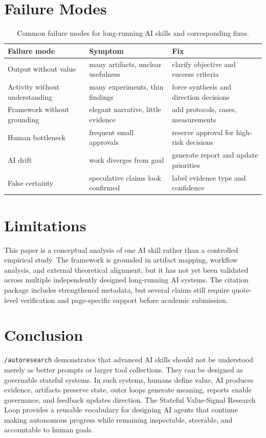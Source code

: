 \documentclass[11pt]{article}
\begin{document}
\section{Failure Modes}

\begin{table}[h]
\centering
\begin{tabular}{lll}
\toprule
Failure mode & Symptom & Fix \\
\midrule
Output without value & many artifacts, unclear usefulness & clarify objective and success criteria \\
Activity without understanding & many experiments, thin findings & force synthesis and direction decisions \\
Framework without grounding & elegant narrative, little evidence & add protocols, cases, measurements \\
Human bottleneck & frequent small approvals & reserve approval for high-risk decisions \\
AI drift & work diverges from goal & generate report and update priorities \\
False certainty & speculative claims look confirmed & label evidence type and confidence \\
\bottomrule
\end{tabular}
\caption{Common failure modes for long-running AI skills and corresponding fixes.}
\label{tab:failures}
\end{table}

\section{Limitations}

This paper is a conceptual analysis of one AI skill rather than a controlled empirical study. The framework is grounded in artifact mapping, workflow analysis, and external theoretical alignment, but it has not yet been validated across multiple independently designed long-running AI systems. The citation package includes strengthened metadata, but several claims still require quote-level verification and page-specific support before academic submission.

\section{Conclusion}

\texttt{/autoresearch} demonstrates that advanced AI skills should not be understood merely as better prompts or larger tool collections. They can be designed as governable stateful systems. In such systems, humans define value, AI produces evidence, artifacts preserve state, outer loops generate meaning, reports enable governance, and feedback updates direction. The Stateful Value-Signal Research Loop provides a reusable vocabulary for designing AI agents that continue making autonomous progress while remaining inspectable, steerable, and accountable to human goals.



\end{document}

